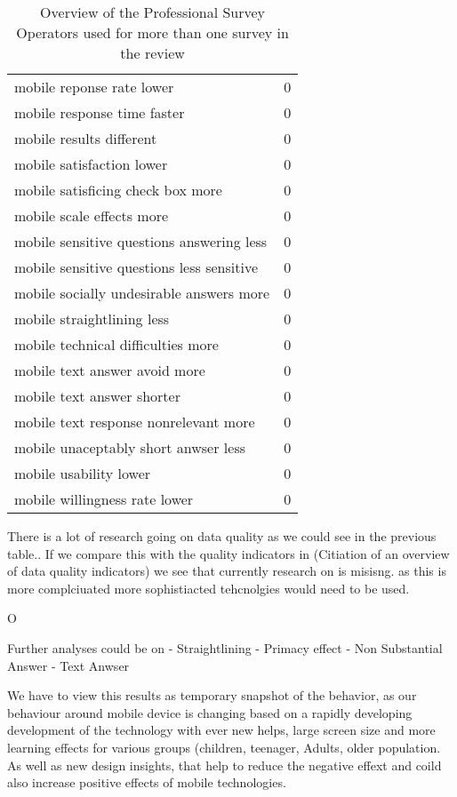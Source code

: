 \begin{table}
\begin{tabular}{ll}
        mobile reponse rate lower    & 0  \\
        mobile response time faster    & 0  \\
        mobile results different    & 0  \\
        mobile satisfaction lower    & 0  \\
        mobile satisficing check box more    & 0  \\
        mobile scale effects more    & 0  \\
        mobile sensitive questions answering less    & 0  \\
        mobile sensitive questions less sensitive    & 0  \\
        mobile socially undesirable answers more    & 0  \\
        mobile straightlining less    & 0  \\
        mobile technical difficulties more    & 0  \\
        mobile text answer avoid more    & 0  \\
        mobile text answer shorter    & 0  \\
        mobile text response nonrelevant more    & 0  \\
        mobile unaceptably short anwser less    & 0  \\
        mobile usability lower    & 0  \\
        mobile willingness rate lower & 0 \\
		\bottomrule 
	\end{tabular}
	\caption{Overview of the Professional Survey Operators used for more than one survey in the review}
	\label{tab: author}
\end{table}

There is a lot of research going on data quality as we could see in the previous table.. If we compare this with the quality indicators in (Citiation of an overview of data quality indicators) we see that currently research on is misisng. as this is more complciuated more sophistiacted tehcnolgies would need to be used. 

O

Further analyses could be on
- Straightlining
- Primacy effect
- Non Substantial Answer
- Text Anwser


We have to view this results as temporary snapshot of the behavior, as our behaviour around mobile device is changing based on a rapidly developing development of the technology with ever new helps, large screen size and more learning effects for various groups (children, teenager, Adults, older population. As well as new design insights, that help to reduce the negative effext and coild also increase positive effects of mobile technologies.

